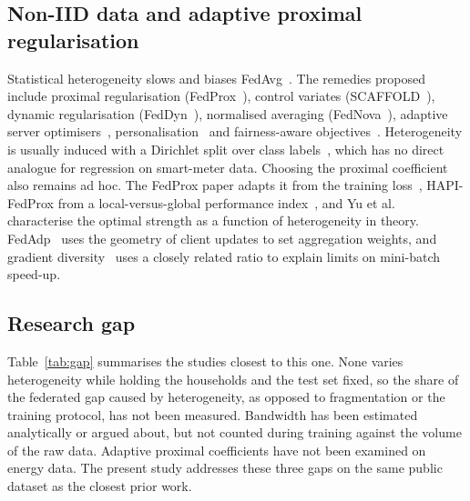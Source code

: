 \subsection{Non-IID data and adaptive proximal regularisation}
Statistical heterogeneity slows and biases FedAvg~\cite{zhao2018noniid,hsieh2020quagmire,kairouz2021advances}. The
remedies proposed include proximal regularisation (FedProx~\cite{li2020fedprox}), control variates
(SCAFFOLD~\cite{karimireddy2020scaffold}), dynamic regularisation (FedDyn~\cite{acar2021feddyn}), normalised averaging
(FedNova~\cite{wang2020fednova}), adaptive server optimisers~\cite{reddi2021fedopt},
personalisation~\cite{fallah2020perfedavg,li2021ditto} and fairness-aware objectives~\cite{li2020qffl}. Heterogeneity is
usually induced with a Dirichlet split over class labels~\cite{hsu2019dirichlet}, which has no direct analogue for
regression on smart-meter data. Choosing the proximal coefficient also remains ad hoc. The FedProx paper adapts it from
the training loss~\cite{li2020fedprox}, HAPI-FedProx from a local-versus-global performance index~\cite{mhou2025hapi},
and Yu et al.~\cite{yu2025pflminimax} characterise the optimal strength as a function of heterogeneity in theory.
FedAdp~\cite{wu2021fedadp} uses the geometry of client updates to set aggregation weights, and gradient
diversity~\cite{yin2018diversity} uses a closely related ratio to explain limits on mini-batch speed-up.

\subsection{Research gap}
Table~\ref{tab:gap} summarises the studies closest to this one. None varies heterogeneity while holding the
households and the test set fixed, so the share of the federated gap caused by heterogeneity, as opposed to
fragmentation or the training protocol, has not been measured. Bandwidth has been estimated analytically or argued
about, but not counted during training against the volume of the raw data. Adaptive proximal coefficients have not been
examined on energy data. The present study addresses these three gaps on the same public dataset as the closest prior
work.

